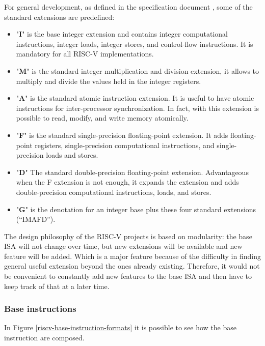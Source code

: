 For general development, as defined in the specification document \cite{riscv-v-specs}, some of the standard extensions are predefined:
\begin{itemize}
    \item "\textbf{I}" is the base integer extension and contains integer computational instructions, integer loads, integer stores, and control-ﬂow instructions. It is mandatory for all RISC-V implementations.
    
    \item "\textbf{M}" is the standard integer multiplication and division extension, it allows to multiply and divide the values held in the integer registers.
    
    \item "\textbf{A}" is the standard atomic instruction extension. It is useful to have atomic instructions for inter-processor synchronization. In fact, with this extension is possible to read, modify, and write memory atomically. 
    
    \item "\textbf{F}" is the standard single-precision ﬂoating-point extension. It adds ﬂoating-point registers, single-precision computational instructions, and single-precision loads and stores. 
    
    \item "\textbf{D}" The standard double-precision ﬂoating-point extension. Advantageous when the F extension is not enough, it expands the extension and adds double-precision computational instructions, loads, and stores.
    
    \item "\textbf{G}" is the denotation for an integer base plus these four standard extensions (“IMAFD”).
\end{itemize}


The design philosophy of the RISC-V projects is based on modularity: the base ISA will not change over time, but new extensions will be available and new feature will be added. Which is a major feature because of the difficulty in finding general useful extension beyond the ones already existing. Therefore, it would not be convenient to constantly add new features to the base ISA and then have to keep track of that at a later time.\\


\subsubsection{Base instructions}
In Figure \ref{riscv-base-instruction-formats} it is possible to see how the base instruction are composed.

